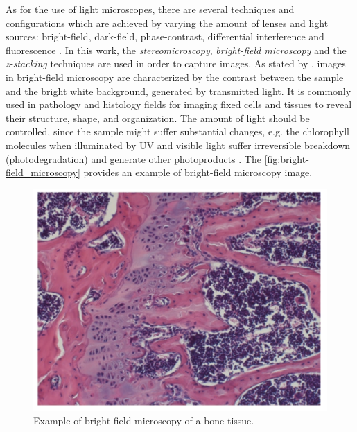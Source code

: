 As for the use of light microscopes, there are several techniques and configurations which are achieved by varying the amount of lenses and light sources: bright-field, dark-field, phase-contrast, differential interference and fluorescence \cite{roane2009microscopic}. In this work, the \emph{stereomicroscopy}, \emph{bright-field microscopy} and the \emph{z-stacking} techniques are used in order to capture images. As stated by , images in bright-field microscopy are characterized by the contrast between the sample and the bright white background, generated by transmitted light. It is commonly used in pathology and histology fields for imaging fixed cells and tissues to reveal their structure, shape, and organization. The amount of light should be controlled, since the sample might suffer substantial changes, e.g. the chlorophyll molecules when illuminated by UV and visible light suffer irreversible breakdown (photodegradation) and generate other photoproducts \cite{petrovic2017clorophyll}. The \autoref{fig:bright-field_microscopy} provides an example of bright-field microscopy image.

\begin{figure}[htb]
	\centering
	\caption{\label{fig:bright-field_microscopy} Example of bright-field microscopy of a bone tissue.}
	\begin{center}
	    \includegraphics[scale=0.3]{images/bright-field_microscopy.png}
	\end{center}
	\centering
\end{figure}

